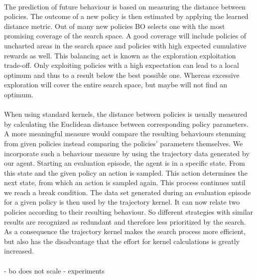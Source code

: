\\
The prediction of future behaviour is based on measuring the distance between policies. The outcome of a new policy is then estimated by applying the learned distance metric. Out of many new policies BO selects one with the most promising coverage of the search space. A good coverage will include policies of uncharted areas in the search space and policies with high expected cumulative rewards as well. This balancing act is known as the exploration exploitation trade-off. Only exploiting policies with a high expectation can lead to a local optimum and thus to a result below the best possible one. Whereas excessive exploration will cover the entire search space, but maybe will not find an optimum.\\
\\
When using standard kernels, the distance between policies is usually measured by calculating the Euclidean distance between corresponding policy parameters. A more meaningful measure would compare the resulting behaviours stemming from given policies instead comparing the policies' parameters themselves. We incorporate such a behaviour measure by using the trajectory data generated by our agent. Starting an evaluation episode, the agent is in a specific state. From this state and the given policy an action is sampled. This action determines the next state, from which an action is sampled again. This process continues until we reach a break condition. The data set generated during an evaluation episode for a given policy is then used by the trajectory kernel. It can now relate two policies according to their resulting behaviour. So different strategies with similar results are recognized as redundant and therefore less prioritized by the search. As a consequence the trajectory kernel makes the search process more efficient, but also has the disadvantage that the effort for kernel calculations is greatly increased.\\
\\

- bo does not scale
- experiments \cite{sutton1998reinforcement}
